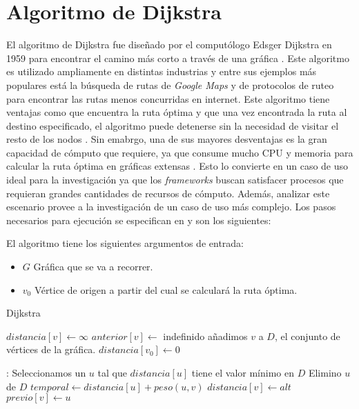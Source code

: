 \section{Algoritmo de Dijkstra}


El algoritmo de Dijkstra fue diseñado por el computólogo Edsger Dijkstra en 1959 para encontrar el camino más corto a través de una gráfica \cite{dijkstraexplicado}. Este algoritmo es utilizado ampliamente en distintas industrias y entre sus ejemplos más populares está la búsqueda de rutas de \textit{Google Maps} y de protocolos de ruteo para encontrar las rutas menos concurridas en internet. Este algoritmo tiene ventajas como que encuentra la ruta óptima y que una vez encontrada la ruta al destino especificado, el algoritmo puede detenerse sin la necesidad de visitar el resto de los nodos \cite{dijkstrabellford}. Sin emabrgo, una de sus mayores desventajas es la gran capacidad de cómputo que requiere, ya que consume mucho CPU y memoria para calcular la ruta óptima en gráficas extensas \cite{dijkstrabellford}. Esto lo convierte en un caso de uso ideal para la investigación ya que los \textit{frameworks} buscan satisfacer procesos que requieran grandes cantidades de recursos de cómputo. Además, analizar este escenario provee a la investigación de un caso de uso más complejo. Los pasos necesarios para ejecución se especifican en \cite{dijkstrabellford} y son los siguientes:

El algoritmo tiene los siguientes argumentos de entrada:
\begin{itemize}
	\item $G$ Gráfica que se va a recorrer.
	\item $v_{0}$ Vértice de origen a partir del cual se calculará la ruta óptima.
\end{itemize}

\begin{algoritmo}[H]
\caption{Dijkstra}\label{Dijkstra}
\begin{algorithmic}[1]
	\State $distancia[v] \gets \infty$
	\State $anterior[v] \gets $ indefinido
	\State añadimos $v$ a $D$, el conjunto de vértices de la gráfica.
\EndFor
\State $distancia[v_{0}] \gets 0$

:
	\State Seleccionamos un $u$ tal que $distancia[u]$ tiene el valor mínimo en $D$
	\State Elimino $u$ de $D$
		\State $temporal \gets distancia[u] + peso(u, v)$
			\State $distancia[v] \gets alt$
			\State $previo[v] \gets u$		
		\EndIf
	\EndFor
\EndWhile
\EndProcedure
\end{algorithmic}
\end{algoritmo}

